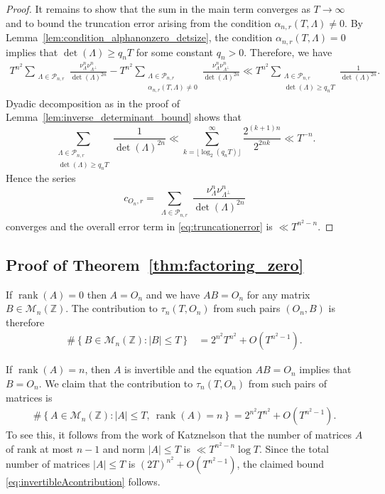 \documentclass[11pt,reqno]{amsart}
\theoremstyle{definition}
\theoremstyle{remark}
\numberwithin{equation}{section}
\numberwithin{thm}{section}
\numberwithin{table}{section}
\def \Z {{\mathbb Z}}
\DeclareMathOperator{\rank}{rank}
\begin{document}
\begin{proof}
It remains to show that the sum in the main term converges as $T \to \infty$ and to bound the truncation error arising from the condition $ \alpha_{n,r}(T,\Lambda)\neq0$.  By Lemma~\ref{lem:condition_alphanonzero_detsize}, the condition
$\alpha_{n,r}(T,\Lambda)=0$ implies that $\det(\Lambda)\ge q_nT$ for some constant $q_n>0$. Therefore, we have 
\begin{align}\label{eq:truncationerror}
    T^{n^2}\sum_{\substack{\Lambda\in\mathcal{P}_{n,r}}}
\frac{\nu_{\Lambda}^n\nu_{\Lambda^\perp}^n}
{\det(\Lambda)^{2n}} -T^{n^2}\sum_{\substack{\Lambda\in\mathcal{P}_{n,r}\\
 \alpha_{n,r}(T,\Lambda)\neq0}} 
 \frac{\nu_{\Lambda}^n\nu_{\Lambda^\perp}^n}
{\det(\Lambda)^{2n}} \ll
T^{n^2}\sum_{\substack{\Lambda\in\mathcal{P}_{n,r}\\
\det(\Lambda)\ge q_nT}} 
 \frac{1}
{\det(\Lambda)^{2n}}.
\end{align}
Dyadic decomposition as in the proof of Lemma~\ref{lem:inverse_determinant_bound} shows that 
\[
\sum_{\substack{\Lambda\in\mathcal{P}_{n,r}\\
\det(\Lambda)\ge q_nT}} 
 \frac{1}
{\det(\Lambda)^{2n}} \ll \sum_{k=\lfloor \log_2(q_nT)\rfloor}^\infty \frac{2^{(k+1)n}}{2^{2nk}} \ll T^{-n}. 
\]
Hence  the series 
\[
    c_{O_n,r} = \sum_{\substack{\Lambda\in\mathcal{P}_{n,r}}}
\frac{\nu_{\Lambda}^n\nu_{\Lambda^\perp}^n}
{\det(\Lambda)^{2n}}
\]
converges and the overall  error term in \eqref{eq:truncationerror} is  $\ll T^{n^2-n}$.
\end{proof}


\subsection{Proof of Theorem~\ref{thm:factoring_zero}}
     If $\rank(A)=0$ then  $A = O_n$ and we have $AB = O_n$ for any matrix $B \in \mathcal{M}_n(\Z)$. The contribution to $\tau_n(T,O_n)$ from such pairs $(O_n,B)$ is therefore
       \begin{align*}
    \#\left\{B\in \mathcal{M}_n(\Z): |B|\leq T \right\}
    &= 2^{n^2}T^{n^2} + O(T^{n^2-1}).
    \end{align*}
    
     If $\rank(A) = n$, then $A$ is invertible and the equation $AB = O_n$ implies that $B = O_n$. We claim that the contribution to $\tau_n(T, O_n)$ from such pairs of matrices is
    \begin{align}\label{eq:invertibleAcontribution}
    \#\left\{A\in \mathcal{M}_n(\Z): |A| \le T,~\rank(A)=n \right\}
    = 2^{n^2}T^{n^2} + O(T^{n^2-1}).
    \end{align}
To see this, it follows from the  work of Katznelson \cite{katznelson} that  the number of matrices $A$ of rank at most $n-1$
    and norm $|A|\le T$ is $\ll T^{n^2 -n}\log T$. Since the total number of matrices $|A| \le T$ is  $(2T)^{n^2}+O(T^{n^2-1})$, the claimed bound \eqref{eq:invertibleAcontribution} follows.
    
\end{document}

